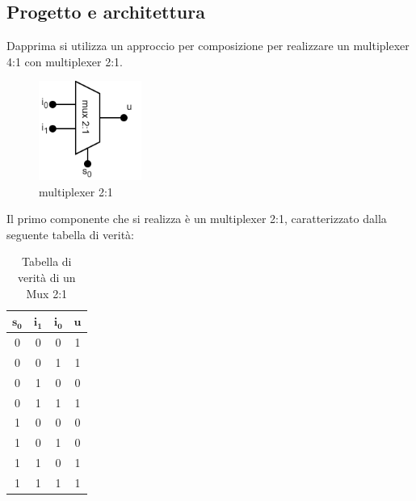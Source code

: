\subsection{Progetto e architettura}
Dapprima si utilizza un approccio per composizione per realizzare un multiplexer 4:1 con multiplexer 2:1.\\
\begin{figure}[H]
	\centering
	\includegraphics[width=0.3\textwidth]{img/mux_2-1}
	\caption{multiplexer 2:1}
	\label{mux_2:1} 
\end{figure}
Il primo componente che si realizza è un multiplexer 2:1, caratterizzato dalla seguente tabella di verità:
\begin{table}[h!]
    \centering
    \begin{tabular}{||c|c|c||c||}
        \hline
        \hline
         $\mathbf{s_0}$ & $\mathbf{i_1}$ & $\mathbf{i_0}$ & $\mathbf{u}$\\
         \hline
         0 & 0 & 0 & 1 \\
         \hline
         0 & 0 & 1 & 1 \\
         \hline
         0 & 1 & 0 & 0 \\
         \hline
         0 & 1 & 1 & 1 \\
         \hline
         1 & 0 & 0 & 0 \\
         \hline
         1 & 0 & 1 & 0 \\
         \hline
         1 & 1 & 0 & 1 \\
         \hline
         1 & 1 & 1 & 1 \\
         \hline
         \hline 
    \end{tabular}
    \caption{Tabella di verità di un Mux 2:1}
    \label{tab:mux_2:1}
\end{table}
    
